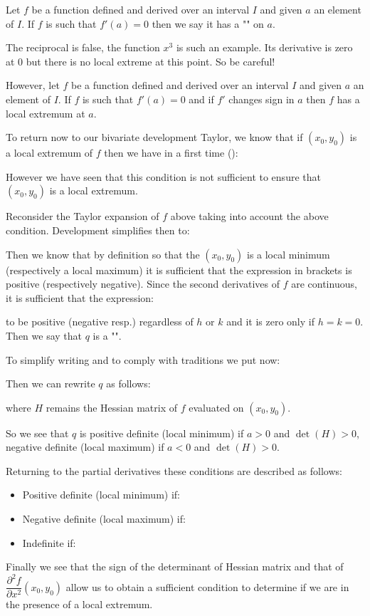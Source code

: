 	Let $f$ be a function defined and derived over an interval $I$ and given $a$ an element of $I$. If $f$ is such that $f'(a)=0$ then we say it has a "\label{local extremum}" on $a$.
	
	\begin{tcolorbox}[title=Remark,colframe=black,arc=10pt]
	The reciprocal is false, the function $x^3$ is such an example. Its derivative is zero at $0$ but there is no local extreme at this point. So be careful!
	\end{tcolorbox}
	
	However, let $f$ be a function defined and derived over an interval $I$ and given $a$ an element of $I$. If $f$ is such that $f'(a)=0$ and if $f'$ changes sign in $a$ then $f$ has a local extremum at $a$.
	
	To return now to our bivariate development Taylor, we know that if $(x_0,y_0)$ is a local extremum of $f$ then we have in a first time ():
	
	However we have seen that this condition is not sufficient to ensure that $(x_0,y_0)$ is a local extremum.
	
	Reconsider the Taylor expansion of $f$ above taking into account the above condition. Development simplifies then to:
	
	Then we know that by definition so that the $(x_0,y_0)$ is a local minimum (respectively a local maximum) it is sufficient that the expression in brackets is positive (respectively negative). Since the second derivatives of $f$ are continuous, it is sufficient that the expression:
	
	to be positive (negative resp.) regardless of $h$ or $k$ and it is zero only if $h=k=0$. Then we say that $q$ is a "".
	
	To simplify writing and to comply with traditions we put now:
	
	Then we can rewrite $q$ as follows:
	
	where $H$ remains the Hessian matrix of $f$ evaluated on $(x_0,y_0)$.
	
	So we see that $q$ is positive definite (local minimum) if $a>0$ and $\det(H)>0$, negative definite (local maximum) if $a<0$ and $\det(H)>0$.
	
	Returning to the partial derivatives these conditions are described as follows:
	\begin{itemize}
		\item Positive definite (local minimum) if:
		
		
		\item Negative definite (local maximum) if:
		
		
		\item Indefinite if:
		
	\end{itemize}
	Finally we see that the sign of the determinant of Hessian matrix and that of $\dfrac{\partial^2 f}{\partial x^2}(x_0,y_0)$ allow us to obtain a sufficient condition to determine if we are in the presence of a local extremum.
	
